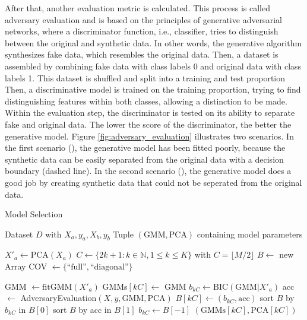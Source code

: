 \documentclass[../../main.tex]{subfiles}
\begin{document}
After that, another evaluation metric is calculated. This process is called adversary evaluation and is based on the principles of generative adversarial networks, where a discriminator function, i.e., classifier, tries to distinguish between the original and synthetic data. In other words, the generative algorithm synthesizes fake data, which resembles the original data. Then, a dataset is assembled by combining fake data with class labels 0 and original data with class labels 1. This dataset is shuffled and split into a training and test proportion Then, a discriminative model is trained on the training proportion, trying to find distinguishing features within both classes, allowing a distinction to be made. Within the evaluation step, the discriminator is tested on its ability to separate fake and original data. The lower the score of the discriminator, the better the generative model. Figure \ref{fig:adversary_evaluation} illustrates two scenarios. In the first scenario (), the generative model has been fitted poorly, because the synthetic data can be easily separated from the original data with a decision boundary (dashed line). In the second scenario (), the generative model does a good job by creating synthetic data that could not be seperated from the original data.

 \begin{algorithm}
    \caption{Model Selection}
    \label{alg:model_selection}
 
    \begin{algorithmic}[1]
        \REQUIRE Dataset $D$ with $X_a, y_a, X_b, y_b$
        \ENSURE Tuple $(\text{GMM}, \text{PCA})$ containing model parameters

        \STATE $X'_a \leftarrow \text{PCA}(X_a)$
        \STATE $C \leftarrow \{2k+1: k \in \mathbb{N}, 1 \leq k \leq K\}$ with $C=\lfloor M / 2 \rfloor$
        \STATE $B \leftarrow$ new Array
        \STATE COV $\leftarrow \{ \text{``full''}, \text{``diagonal''} \}$

                \STATE GMM $\leftarrow \text{fitGMM}(X'_a)$
                \STATE GMMs$[kC] \leftarrow$ GMM
                \STATE $b_{kC} \leftarrow \text{BIC}(\text{GMM}|X'_a)$
                \STATE acc $\leftarrow$ AdversaryEvaluation$(X, y, \text{GMM}, \text{PCA})$
                \STATE $B[kC] \leftarrow (b_{kC}, \text{acc})$
            \ENDFOR
        \ENDFOR
        \STATE sort $B$ by $b_{kC}$ in $B[0]$
        \STATE sort $B$ by acc in $B[1]$
        \STATE $b_{kC} \leftarrow B[-1]$
        \RETURN $(\text{GMMs}[kC], \text{PCA}[kC])$
    \end{algorithmic}
 \end{algorithm}
\end{document}
